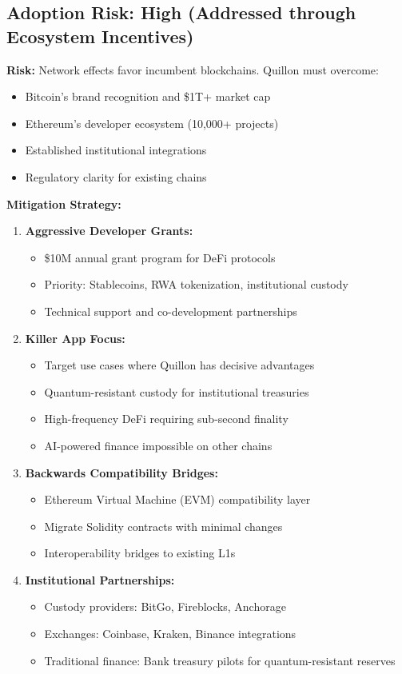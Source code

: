 \documentclass[11pt,a4paper]{article}
\begin{document}
\subsection{Adoption Risk: High (Addressed through Ecosystem Incentives)}

\textbf{Risk:} Network effects favor incumbent blockchains. Quillon must overcome:
\begin{itemize}[leftmargin=*]
\item Bitcoin's brand recognition and \$1T+ market cap
\item Ethereum's developer ecosystem (10,000+ projects)
\item Established institutional integrations
\item Regulatory clarity for existing chains
\end{itemize}

\textbf{Mitigation Strategy:}

\begin{enumerate}[leftmargin=*]
\item \textbf{Aggressive Developer Grants:}
\begin{itemize}
    \item \$10M annual grant program for DeFi protocols
    \item Priority: Stablecoins, RWA tokenization, institutional custody
    \item Technical support and co-development partnerships
\end{itemize}

\item \textbf{Killer App Focus:}
\begin{itemize}
    \item Target use cases where Quillon has decisive advantages
    \item Quantum-resistant custody for institutional treasuries
    \item High-frequency DeFi requiring sub-second finality
    \item AI-powered finance impossible on other chains
\end{itemize}

\item \textbf{Backwards Compatibility Bridges:}
\begin{itemize}
    \item Ethereum Virtual Machine (EVM) compatibility layer
    \item Migrate Solidity contracts with minimal changes
    \item Interoperability bridges to existing L1s
\end{itemize}

\item \textbf{Institutional Partnerships:}
\begin{itemize}
    \item Custody providers: BitGo, Fireblocks, Anchorage
    \item Exchanges: Coinbase, Kraken, Binance integrations
    \item Traditional finance: Bank treasury pilots for quantum-resistant reserves
\end{itemize}
\end{enumerate}
\end{document}
